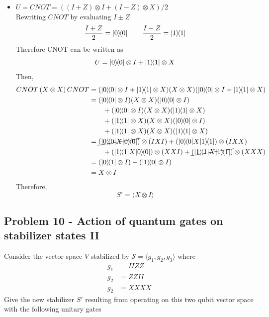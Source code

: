 \begin{itemize}
    \item $U = CNOT = ((I+Z) \otimes I + (I-Z)\otimes X) / 2$ \\
    Rewriting $CNOT$ by evaluating $I\pm Z$
    \begin{equation}
        \frac{I+Z}{2} = \ketbra{0} \qquad \frac{I-Z}{2} = \ketbra{1}
    \end{equation}
    Therefore CNOT can be written as 
    \begin{equation}
        U = \ketbra{0}\otimes I + \ketbra{1} \otimes X
    \end{equation}
    Then,
    \begin{align}
        CNOT\,(X \otimes X) \,CNOT &= (\ketbra{0}\otimes I + \ketbra{1} \otimes X)(X \otimes X)(\ketbra{0}\otimes I + \ketbra{1} \otimes X) \\
        &= (\ketbra{0}\otimes I)(X \otimes X)(\ketbra{0}\otimes I) \notag \\
        &\qquad + (\ketbra{0}\otimes I)(X \otimes X)(\ketbra{1}\otimes X) \notag \\
        &\qquad + (\ketbra{1}\otimes X)(X \otimes X)(\ketbra{0}\otimes I) \notag \\
        &\qquad + (\ketbra{1}\otimes X)(X \otimes X)(\ketbra{1}\otimes X) \\
        &= \cancel{(\ketbra{0}\!X\!\ketbra{0})} \otimes (IXI) + (\ketbra{0}\!X\!\ketbra{1}) \otimes (IXX) \notag \\
        &\qquad + (\ketbra{1}\!X\!\ketbra{0}) \otimes (XXI) + \cancel{(\ketbra{1}\!X\!\ketbra{1})} \otimes (XXX) \\
        &=(\ketbra{0}{1}\otimes I) + (\ketbra{1}{0} \otimes I) \\
        &=X \otimes I
    \end{align}
    Therefore, 
    \begin{equation}
        S' = \langle X \otimes I \rangle
    \end{equation}
\end{itemize}



\newpage
\subsection{Problem 10 - Action of quantum gates on stabilizer states II}
Consider the vector space $V$ stabilized by $\mathcal{S} = \langle g_1, g_2, g_3 \rangle$ where
\begin{align}
    g_1 &= IIZZ \\
    g_2 &= ZZII \\
    g_2 &= XXXX
\end{align}
Give the new stabilizer $S'$ resulting from operating on this two qubit vector space with the following unitary gates

